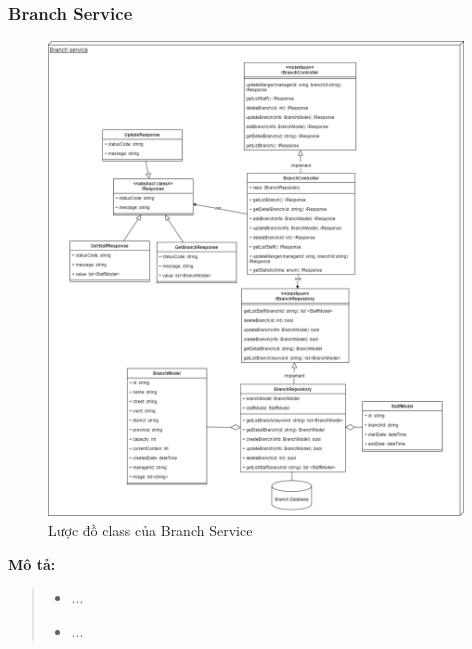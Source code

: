 \subsubsection{Branch Service}
\begin{figure}[!htp]
	\centering
	\includegraphics[width=11cm]{img/Architecture/service/BranchService.png}
	\newline
	\caption{Lược đồ class của Branch Service}
\end{figure}
\textbf{Mô tả:}
\begin{quote}
	\begin{itemize}
		\item ...
		\item ...
	\end{itemize}
\end{quote}


